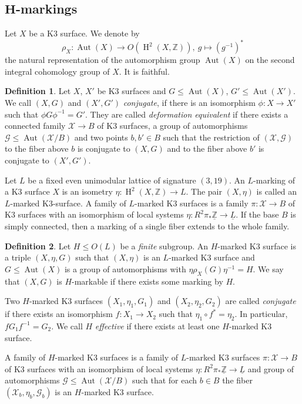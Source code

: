 \documentclass[a4paper]{amsart}
\theoremstyle{definition}
\newtheorem{definition}{Definition}[section]
\theoremstyle{plain}
\DeclareMathOperator{\Aut}{Aut}
\DeclareMathOperator{\HH}{H}
\newcommand{\ZZ}{\mathbb{Z}}
\newcommand{\X}{\mathcal{X}}
\newcommand{\G}{\mathcal{G}}
\begin{document}
\subsection{$\mathbf{H}$-markings}
Let $X$ be a K3 surface. We denote by
\[\rho_X\colon \Aut(X) \rightarrow O(\HH^2(X,\ZZ)),\  g\mapsto (g^{-1})^*\]
the natural representation of the automorphism group $\Aut(X)$ on the second integral cohomology group of $X$.
It is faithful.
\begin{definition}\label{defequivalent}
Let $X$, $X'$ be K3 surfaces and $G \leq \Aut(X)$, $G' \leq \Aut(X')$. We call $(X,G)$ and $(X',G')$ \emph{conjugate}, if
there is an isomorphism $\phi\colon X \to X'$ such that
$\phi G \phi^{-1} = G'$.
  They are called \emph{deformation equivalent} if there exists a connected family $\X \to B$ of K3 surfaces, a group of automorphisms $\G \leq \Aut(\X/B)$ and
two points $b,b' \in B$ such that the restriction of $(\X,\G)$ to the
fiber above $b$ is conjugate to $(X,G)$ and to the fiber above $b'$ is conjugate to $(X',G')$.
\end{definition}

Let $L$ be a fixed even unimodular lattice of signature $(3,19)$.
An $L$-marking of a K3 surface $X$ is an isometry
$\eta \colon \HH^2(X,\ZZ) \to L$.
The pair $(X, \eta)$ is called an $L$-marked K3-surface.
A family of $L$-marked K3 surfaces is a family $\pi \colon \X \to B$ of K3 surfaces with an isomorphism of local systems $\eta \colon R^2\pi_*\underline{\ZZ} \to \underline{L}$. If the base $B$ is simply connected, then a marking of a single fiber extends to the whole family.

\begin{definition}
  Let $H \leq O(L)$ be a \emph{finite} subgroup. An $H$-marked K3 surface is a triple $(X, \eta, G)$ such that $(X, \eta)$ is an $L$-marked K3 surface and $G \leq \Aut(X)$ is a group of automorphisms with $\eta \rho_X(G) \eta^{-1} = H$.
 We say that $(X,G)$ is $H$-markable if there exists some marking by $H$.

 Two $H$-marked K3 surfaces $(X_1, \eta_1, G_1)$
 and $(X_2,\eta_2, G_2)$ are called \emph{conjugate} if there exists an isomorphism $f \colon X_1 \to X_2$ such that $\eta_1 \circ f^* = \eta_2$. In particular, $fG_1f^{-1}=G_2$. We call $H$ \emph{effective} if there exists at least one $H$-marked K3 surface.
\end{definition}

A family of $H$-marked K3 surfaces is a family of $L$-marked K3 surfaces
$\pi \colon \X \to B$ of K3 surfaces with an isomorphism of local systems $\eta \colon R^2\pi_*\underline{\ZZ} \to \underline{L}$ and group of automorphisms $\G \leq \Aut(\X/B)$ such that for each $b\in B$ the fiber $(\X_b,\eta_b,\G_b)$ is an $H$-marked K3 surface.
\end{document}
